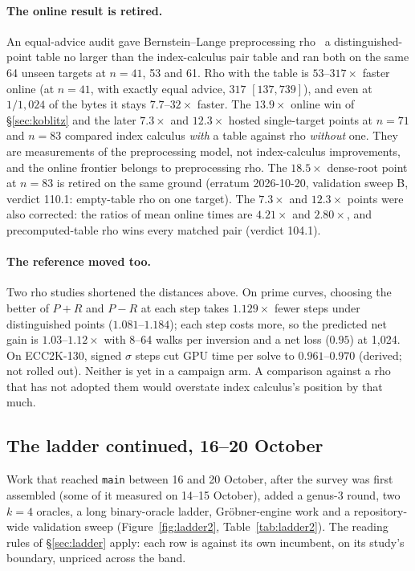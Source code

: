 \paragraph{The online result is retired.} An equal-advice audit
gave Bernstein--Lange preprocessing rho~\cite{bl2012} a distinguished-point
table no larger than the index-calculus pair table and ran both on the same
64 unseen targets at $n=41$, 53 and 61. Rho with the table is $53$--$317\times$
faster online (at $n=41$, with exactly equal advice, $317$ $[137,739]$), and
even at $1/1{,}024$ of the bytes it stays $7.7$--$32\times$ faster. The
$13.9\times$ online win of \S\ref{sec:koblitz} and the later $7.3\times$ and
$12.3\times$ hosted single-target points at $n=71$ and $n=83$ compared
index calculus \emph{with} a table against rho \emph{without} one. They are
measurements of the preprocessing model, not index-calculus improvements,
and the online frontier belongs to preprocessing rho.
The $18.5\times$ dense-root point at $n=83$ is retired on the same ground
(erratum 2026-10-20, validation sweep B, verdict 110.1: empty-table rho on one
target). The $7.3\times$ and $12.3\times$ points were also corrected: the
ratios of mean online times are $4.21\times$ and $2.80\times$, and
precomputed-table rho wins every matched pair (verdict 104.1).

\paragraph{The reference moved too.} Two rho studies shortened the
distances above. On prime curves, choosing the better of $P+R$ and $P-R$
at each step takes $1.129\times$ fewer steps under distinguished points
($1.081$--$1.184$); each step costs more, so the predicted net gain is
$1.03$--$1.12\times$ with 8--64 walks per inversion and a net loss ($0.95$)
at 1{,}024. On ECC2K-130, signed $\sigma$ steps cut GPU time per
solve to $0.961$--$0.970$ (derived; not rolled out). Neither is yet in a
campaign arm. A comparison against a rho that has not adopted them would
overstate index calculus's position by that much.

\subsection{The ladder continued, 16--20 October}\label{sec:ladder2}

Work that reached \texttt{main} between 16 and 20 October, after the survey
was first assembled (some of it measured on 14--15 October), added a
genus-3 round, two $k=4$ oracles, a long binary-oracle ladder, Gr\"obner-engine work and a
repository-wide validation sweep (Figure~\ref{fig:ladder2},
Table~\ref{tab:ladder2}). The reading rules of \S\ref{sec:ladder} apply:
each row is against its own incumbent, on its study's boundary, unpriced
across the band.

